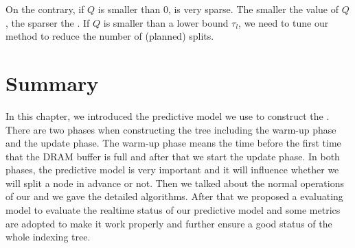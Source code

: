 On the contrary, if $Q$ is smaller than 0, \bptree is very sparse.
The smaller the value of $Q$, the sparser the \bptree. If $Q$ is smaller
than a lower bound $\tau_l$, we need to tune our method to reduce
the number of (planned) splits.






\iffalse
$PNO_L \leftarrow $ GetPredictedNumber($L$)\;
    $ANO_L \leftarrow $ GetAccomodatedNumber($L$)\;
    \If{$PNO_L \leq ANO_L$}{
        insert \key{} into $L$\;
        return\;
    }
    \Else{
        $midKey \leftarrow GetMiddleKey(L)$\;
        $midKey$ is pushed upward to the parent $p$ \;
        A new leaf node $L'$ is created and new pointer from the parent node to $L'$ \;
        Remove keys larger than $midKey$ from $L$ to $L'$ \;
        \upgrade($p$, Histogram) \;
    }
\fi

\section{Summary}
In this chapter, we introduced the predictive model we use to construct the \bptree. There are two phases when constructing the tree including 
the warm-up phase and the update phase. The warm-up phase means the time before the first time that the DRAM buffer is full and after that we 
start the update phase. In both phases, the predictive model is very important and it will influence whether we will split a node in advance or not. 
Then we talked about the normal operations of our \bptree and we gave the detailed algorithms. After that we proposed a evaluating model to evaluate the 
realtime status of our predictive model and some metrics are adopted to make it work properly and further ensure a good status of the whole indexing tree. 

\newpage
